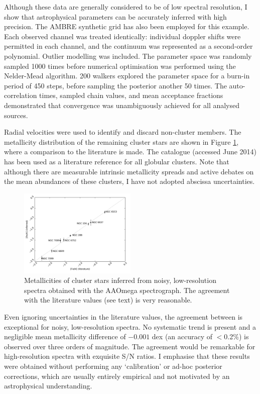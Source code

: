 \documentclass[iop]{emulateapj}
\begin{document}
Although these data are generally considered to be of low spectral resolution, 
I show that astrophysical parameters can be accurately inferred with high 
precision. The AMBRE synthetic grid has also been employed for this example. 
Each observed channel was treated identically: individual doppler shifts were 
permitted in each channel, and the continuum was represented as a second-order 
polynomial. Outlier modelling was included.
The parameter space was randomly sampled 1000 times before numerical optimisation 
was performed using the Nelder-Mead algorithm. 200 walkers explored the parameter 
space for a burn-in period of 450 steps, before sampling the posterior another 
50 times. The auto-correlation times, sampled chain values, and mean acceptance 
fractions demonstrated that convergence was unambiguously achieved for all 
analysed sources.

Radial velocities were used to identify and discard non-cluster members. The 
metallicity distribution of the remaining cluster stars are shown in Figure 
\ref{fig:clusters}, where a comparison to the literature is made. The 
\citet{harris} catalogue (accessed June 2014) has been used as a literature 
reference for all globular clusters. Note that although there are measurable 
intrinsic metallicity spreads and active debates on the mean abundances 
of these clusters, I have not adopted abscissa uncertainties.

\begin{figure}[h!]
\label{fig:clusters}
\includegraphics[width=0.5\textwidth]{figures/clusters.pdf}
\caption{Metallicities of cluster stars inferred from noisy, low-resolution 
spectra obtained with the AAOmega spectrograph. The agreement with the 
literature values (see text) is very reasonable.}
\end{figure}

Even ignoring uncertainties in the literature values, the agreement between is 
exceptional for noisy, low-resolution spectra. No systematic trend is present 
and a negligible mean metallicity difference of $-0.001$ dex (an accuracy of $<$0.2\%) 
is observed over three orders of magnitude. The agreement would be remarkable 
for high-resolution spectra with exquisite S/N ratios. I emphasise that these 
results were obtained without performing any `calibration' or ad-hoc posterior 
corrections, which are usually entirely empirical and not motivated by an 
astrophysical understanding.
\end{document}
